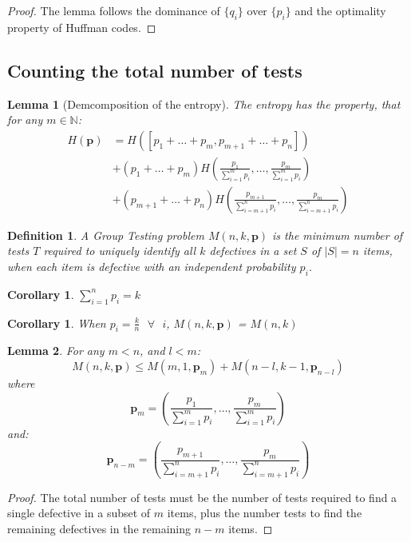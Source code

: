 \documentclass[11pt]{article}
\renewcommand{\vec}[1]{\mathbf{#1}}
\newtheorem{lem}{Lemma}[section]
\newtheorem{definition}{Definition}[section]
\newtheorem{cor}{Corollary}[section]
\theoremstyle{plain}
\newtheorem{cor}[theorem]{Corollary}
\newtheorem{definition}[theorem]{Definition}
\begin{document}
\begin{proof}
The lemma follows the dominance of \(\{q_i\}\) over \(\{p_i\}\) and the optimality property of Huffman codes.
\end{proof}

\subsection{Counting the total number of tests}

\begin{lem}[Demcomposition of the entropy]
The entropy has the property, that for any \(m \in \mathbb{N}\):
\begin{align}
H\left(\vec{p}\right) &= H\left([p_1+\ldots + p_m,p_{m+1}+\ldots + p_n]\right) \\
&+ \left(p_1 + \ldots + p_m\right)H\left(\frac{p_1}{\sum_{i=1}^m p_i},\ldots,\frac{p_m}{\sum_{i=1}^m p_i}\right) \\
&+ \left(p_{m+1} + \ldots + p_n\right)H\left(\frac{p_{m+1}
}{\sum_{i=m+1}^n p_i},\ldots,\frac{p_m}{\sum_{i=m+1}^n p_i}\right)
\end{align}
\end{lem}

\begin{definition}
A Group Testing problem \( M\left(n,k,\vec{p}\right) \) is the minimum number of tests \(T \) required to uniquely identify all \(k\) defectives in a set \(S\) of \(\lvert S \rvert = n \) items, when each item is defective with an independent probability \(p_i\).
\end{definition}

\begin{cor}
\(\sum_{i=1}^n p_i = k\)
\end{cor}

\begin{cor}
When \(p_i = \frac{k}{n} \text{ } \forall \text{ } i\), \( M\left(n,k,\vec{p}\right) \) = \( M\left(n,k\right) \)
\end{cor}

\begin{lem}
For any \(m < n\), and \(l<m\):
\begin{equation}
M\left(n,k,\vec{p}\right) \leq M\left(m,1,\vec{p}_m\right) + M\left(n-l,k-1,\vec{p}_{n-l}\right)
\end{equation}
where 
\begin{equation}
\vec{p}_m = \left(\frac{p_1}{\sum_{i=1}^m p_i},\ldots,\frac{p_m}{\sum_{i=1}^m p_i}\right)
\end{equation}
and:
\begin{equation}
\vec{p}_{n-m} = \left(\frac{p_{m+1}
}{\sum_{i=m+1}^n p_i},\ldots,\frac{p_m}{\sum_{i=m+1}^n p_i}\right)
\end{equation}
\end{lem}
\begin{proof}
The total number of tests must be the number of tests required to find a single defective in a subset of \(m\) items, plus the number tests to find the remaining defectives in the remaining \(n-m\) items.
\end{proof}
\end{document}
